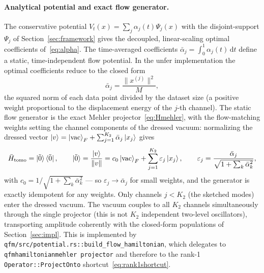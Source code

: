 \documentclass[11pt, a4paper]{article}
\begin{document}
\paragraph{Analytical potential and exact flow generator.} The
conservative potential $V_t(x)=\sum_j\alpha_j(t)\Psi_j(x)$ with the
disjoint-support $\Psi_j$ of Section~\ref{sec:framework} gives the
decoupled, linear-scaling optimal coefficients of~\eqref{eq:alpha}. The
time-averaged coefficients $\bar\alpha_j=\int_0^1\alpha_j(t)\,\mathrm{d}t$
define a static, time-independent flow potential. In the unfer
implementation the optimal coefficients reduce to the closed form
\begin{equation}
  \bar\alpha_j=\frac{\|x^{(j)}\|^2}{M},
\end{equation}
the squared norm of each data point divided by the dataset size (a positive
weight proportional to the displacement energy of the $j$-th channel).
The static flow generator is the exact Mehler
projector~\eqref{eq:Hmehler}, with the flow-matching weights setting the
channel components of the dressed vacuum: normalizing the dressed vector
$\ket{v}=\ket{\mathrm{vac}}_F+\sum_{j=1}^{K_2}\bar\alpha_j\ket{x_j}$ gives
\begin{equation}
  \bar H_{\mathrm{tomo}}=\ket{\tilde 0}\bra{\tilde 0},\qquad
  \ket{\tilde 0}=\frac{\ket{v}}{\|v\|}
  =c_0\ket{\mathrm{vac}}_F+\sum_{j=1}^{K_2}\varepsilon_j\ket{x_j},\qquad
  \varepsilon_j=\frac{\bar\alpha_j}{\sqrt{1+\sum_k\bar\alpha_k^2}},
  \label{eq:Htomo}
\end{equation}
with $c_0=1/\sqrt{1+\sum_k\bar\alpha_k^2}$ --- so
$\varepsilon_j\to\bar\alpha_j$ for small weights, and the generator is
exactly idempotent for any weights. Only channels $j<K_2$ (the sketched
modes) enter the dressed vacuum. The vacuum couples to all $K_2$ channels
simultaneously through the single projector (this is not $K_2$ independent
two-level oscillators), transporting amplitude coherently with the
closed-form populations of Section~\ref{sec:impl}. This is implemented by
\texttt{qfm/src/potential.rs::build\_flow\_hamiltonian}, which delegates
to \texttt{qfm\textunderscore hamiltonian\textunderscore mehler\textunderscore
projector} and therefore to the rank-1
\texttt{Operator::ProjectOnto} shortcut~\eqref{eq:rank1shortcut}.
\end{document}
